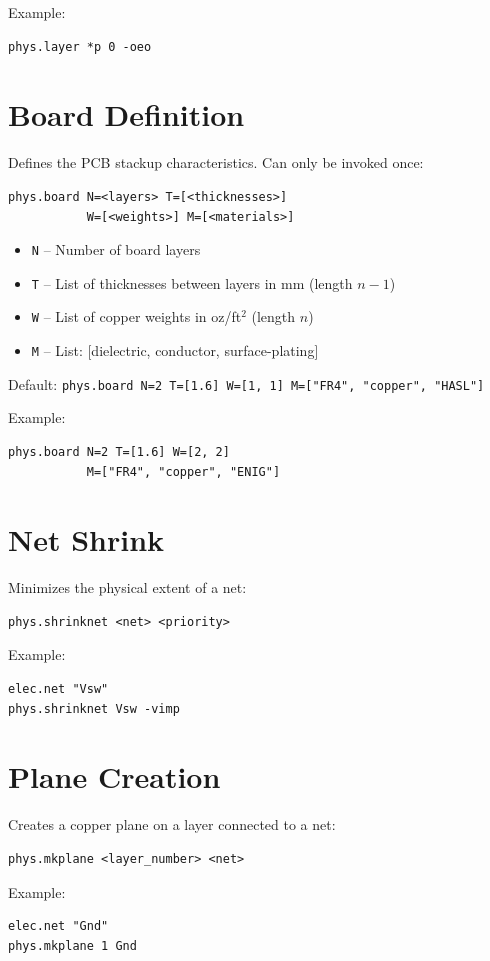 \documentclass{report}
\begin{document}
Example:
\begin{verbatim}
phys.layer *p 0 -oeo
\end{verbatim}

\section{Board Definition}
Defines the PCB stackup characteristics. Can only be invoked once:
\begin{verbatim}
phys.board N=<layers> T=[<thicknesses>] 
           W=[<weights>] M=[<materials>]
\end{verbatim}
\begin{itemize}
\item \texttt{N} -- Number of board layers
\item \texttt{T} -- List of thicknesses between layers in mm (length $n-1$)
\item \texttt{W} -- List of copper weights in oz/ft$^2$ (length $n$)
\item \texttt{M} -- List: [dielectric, conductor, surface-plating]
\end{itemize}

Default: \texttt{phys.board N=2 T=[1.6] W=[1, 1] 
         M=["FR4", "copper", "HASL"]}

Example:
\begin{verbatim}
phys.board N=2 T=[1.6] W=[2, 2] 
           M=["FR4", "copper", "ENIG"]
\end{verbatim}

\section{Net Shrink}
Minimizes the physical extent of a net:
\begin{verbatim}
phys.shrinknet <net> <priority>
\end{verbatim}

Example:
\begin{verbatim}
elec.net "Vsw"
phys.shrinknet Vsw -vimp
\end{verbatim}

\section{Plane Creation}
Creates a copper plane on a layer connected to a net:
\begin{verbatim}
phys.mkplane <layer_number> <net>
\end{verbatim}

Example:
\begin{verbatim}
elec.net "Gnd"
phys.mkplane 1 Gnd
\end{verbatim}
\end{document}

